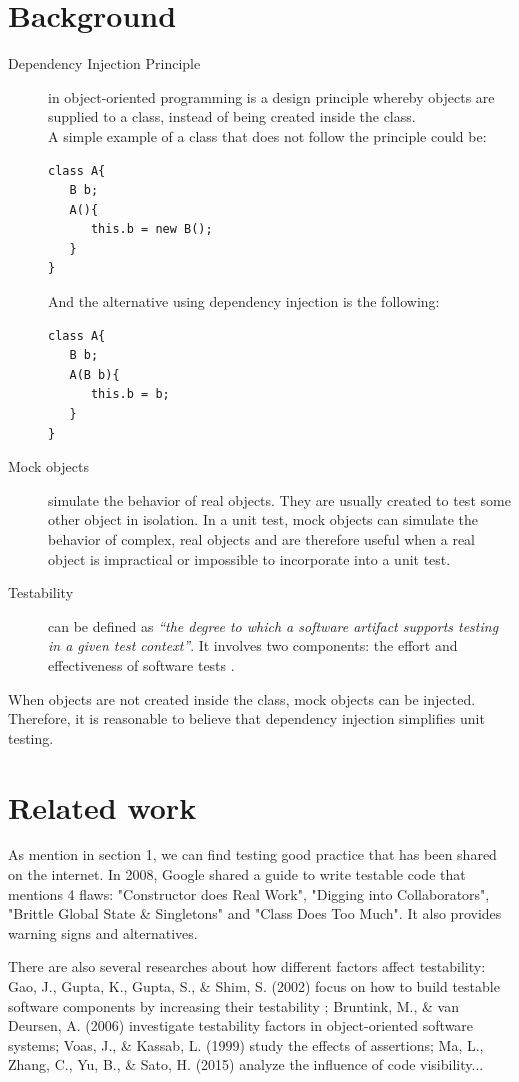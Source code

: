 \documentclass[11pt, a4paper, twocolumn]{article}
\begin{document}
\section{Background} \label{background}
\begin{description}
\item [Dependency Injection Principle] in object-oriented programming is a design principle whereby objects are supplied to a class, instead of being created inside the class.\\
A simple example of a class that does not follow the principle could be:
\begin{verbatim}
class A{	
   B b;
   A(){
      this.b = new B();
   }
}
\end{verbatim}
And the alternative using dependency injection is the following:
\begin{verbatim}
class A{	
   B b;
   A(B b){
      this.b = b;
   }
}
\end{verbatim}
\item [Mock objects] simulate the behavior of real objects. They are usually created to test some other object in isolation. In a unit test, mock objects can simulate the behavior of complex, real objects and are therefore useful when a real object is impractical or impossible to incorporate into a unit test. 
\item [Testability] can be defined as \textit{“the degree to which a software artifact supports testing in a given test context”}. It involves two components: the effort and effectiveness of software tests .
\end{description}
When objects are not created inside the class, mock objects can be injected. Therefore, it is reasonable to believe that dependency injection simplifies unit testing. 




\section{Related work}
As mention in section 1, we can find testing good practice that has been shared on the internet. In 2008, Google shared a guide to write testable code \cite{testablecode} that mentions 4 flaws: "Constructor does Real Work", "Digging into Collaborators", "Brittle Global State \& Singletons" and "Class Does Too Much". It also provides warning signs and alternatives.

There are also several researches about how different factors affect testability: 
{\color{myblue} Gao, J., Gupta, K., Gupta, S., \& Shim, S. (2002)} \cite{testablecomponents} focus on how to build testable software components by increasing their testability ;
{\color{myblue} Bruntink, M., \& van Deursen, A. (2006)}  \cite{classtestability} investigate testability factors in object-oriented software systems; 
{\color{myblue} Voas, J., \& Kassab, L. (1999)} \cite{assertions} study the effects of assertions;
{\color{myblue} Ma, L., Zhang, C., Yu, B., \& Sato, H. (2015)} \cite{visibility} analyze the influence of code visibility...
\end{document}
